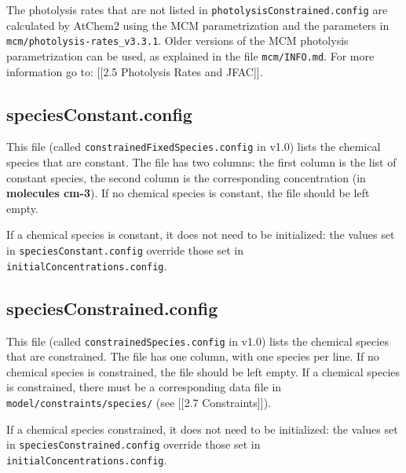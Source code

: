 The photolysis rates that are not listed in
\texttt{photolysisConstrained.config} are calculated by AtChem2 using
the MCM parametrization and the parameters in
\texttt{mcm/photolysis-rates\_v3.3.1}. Older versions of the MCM
photolysis parametrization can be used, as explained in the file
\texttt{mcm/INFO.md}. For more information go to: {[}{[}2.5 Photolysis
Rates and JFAC{]}{]}.

\hypertarget{speciesconstant.config}{%
\subsection{speciesConstant.config}\label{speciesconstant.config}}

This file (called \texttt{constrainedFixedSpecies.config} in v1.0) lists
the chemical species that are constant. The file has two columns: the
first column is the list of constant species, the second column is the
corresponding concentration (in \textbf{molecules cm-3}). If no chemical
species is constant, the file should be left empty.

If a chemical species is constant, it does not need to be initialized:
the values set in \texttt{speciesConstant.config} override those set in
\texttt{initialConcentrations.config}.

\hypertarget{speciesconstrained.config}{%
\subsection{speciesConstrained.config}\label{speciesconstrained.config}}

This file (called \texttt{constrainedSpecies.config} in v1.0) lists the
chemical species that are constrained. The file has one column, with one
species per line. If no chemical species is constrained, the file should
be left empty. If a chemical species is constrained, there must be a
corresponding data file in \texttt{model/constraints/species/} (see
{[}{[}2.7 Constraints{]}{]}).

If a chemical species constrained, it does not need to be initialized:
the values set in \texttt{speciesConstrained.config} override those set
in \texttt{initialConcentrations.config}.

